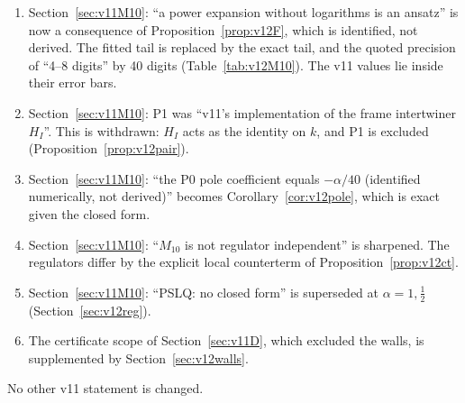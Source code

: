 \begin{enumerate}[label=(C\arabic*)]
\item Section~\ref{sec:v11M10}: ``a power expansion without
logarithms is an ansatz'' is now a consequence of
Proposition~\ref{prop:v12F}, which is identified, not derived. The
fitted tail is replaced by the exact tail, and the quoted precision
of ``4--8 digits'' by 40 digits (Table~\ref{tab:v12M10}). The v11
values lie inside their error bars.
\item Section~\ref{sec:v11M10}: P1 was ``v11's implementation of the
frame intertwiner \(H_I\)''. This is withdrawn: \(H_I\) acts as the
identity on \(k\), and P1 is excluded (Proposition~\ref{prop:v12pair}).
\item Section~\ref{sec:v11M10}: ``the P0 pole coefficient equals
\(-\alpha/40\) (identified numerically, not derived)'' becomes
Corollary~\ref{cor:v12pole}, which is exact given the closed form.
\item Section~\ref{sec:v11M10}: ``\(M_{10}\) is not regulator
independent'' is sharpened. The regulators differ by the explicit
local counterterm of Proposition~\ref{prop:v12ct}.
\item Section~\ref{sec:v11M10}: ``PSLQ: no closed form'' is
superseded at \(\alpha=1,\tfrac12\) (Section~\ref{sec:v12reg}).
\item The certificate scope of Section~\ref{sec:v11D}, which excluded
the walls, is supplemented by Section~\ref{sec:v12walls}.
\end{enumerate}
No other v11 statement is changed.
